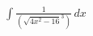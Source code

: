 \documentclass[preview]{standalone}
\begin{document}
\begin{align*}
\int \frac{1}{(\sqrt{4x^2-16}^3)} \, dx
\end{align*}
\end{document}
